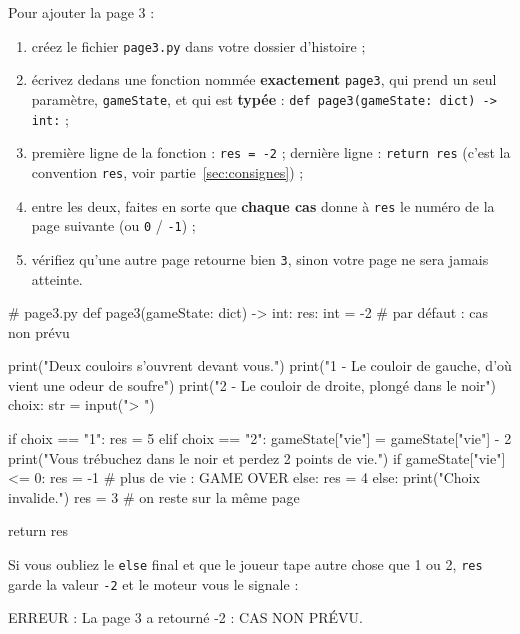 \documentclass[11pt,a4paper]{article}
\newcommand{\fichier}[1]{\texttt{\color{nuit}#1}}
\begin{document}
Pour ajouter la page 3 :
\begin{enumerate}
  \item créez le fichier \fichier{page3.py} dans votre dossier d'histoire ;
  \item écrivez dedans une fonction nommée \textbf{exactement} \texttt{page3}, qui prend
        un seul paramètre, \texttt{gameState}, et qui est \textbf{typée} :
        \texttt{def page3(gameState: dict) -> int:} ;
  \item première ligne de la fonction : \texttt{res = -2} ; dernière ligne :
        \texttt{return res} (c'est la convention \texttt{res}, voir
        partie~\ref{sec:consignes}) ;
  \item entre les deux, faites en sorte que \textbf{chaque cas} donne à \texttt{res} le
        numéro de la page suivante (ou \texttt{0} / \texttt{-1}) ;
  \item vérifiez qu'une autre page retourne bien \texttt{3}, sinon votre page ne sera
        jamais atteinte.
\end{enumerate}

\begin{code}
# page3.py
def page3(gameState: dict) -> int:
    res: int = -2              # par défaut : cas non prévu

    print("Deux couloirs s'ouvrent devant vous.")
    print("1 - Le couloir de gauche, d'où vient une odeur de soufre")
    print("2 - Le couloir de droite, plongé dans le noir")
    choix: str = input("> ")

    if choix == "1":
        res = 5
    elif choix == "2":
        gameState["vie"] = gameState["vie"] - 2
        print("Vous trébuchez dans le noir et perdez 2 points de vie.")
        if gameState["vie"] <= 0:
            res = -1           # plus de vie : GAME OVER
        else:
            res = 4
    else:
        print("Choix invalide.")
        res = 3                # on reste sur la même page

    return res
\end{code}

Si vous oubliez le \texttt{else} final et que le joueur tape autre chose que 1 ou 2,
\texttt{res} garde la valeur \texttt{-2} et le moteur vous le signale :

\begin{code}
ERREUR : La page 3 a retourné -2 : CAS NON PRÉVU.
\end{code}
\end{document}
